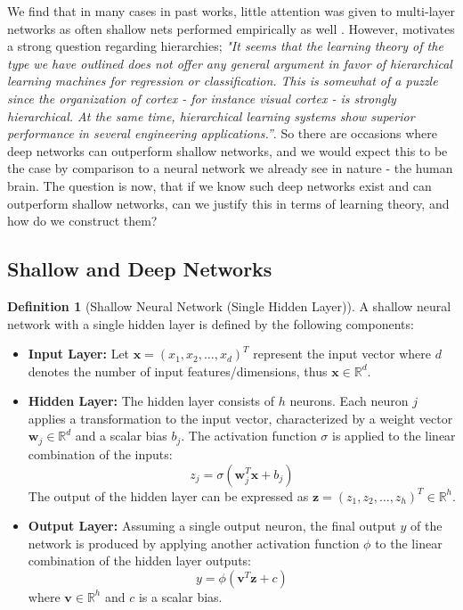 \documentclass[11pt,a4paper]{article}
\theoremstyle{plain}
\theoremstyle{definition}
\newtheorem{definition}[theorem]{Definition}
\theoremstyle{remark}
\begin{document}
\begin{itemize}
    We find that in many cases in past works, little attention was given to multi-layer networks as often shallow nets performed empirically as well \cite{what}. However, \cite{poggioHierarchy} motivates a strong question regarding hierarchies; \textit{"It seems that the learning theory of the type we have outlined does not offer any general argument in favor of hierarchical learning machines for regression or classification. This is somewhat of a puzzle since the organization of cortex - for instance visual cortex - is strongly hierarchical. At the same time, hierarchical learning systems show superior performance in several engineering applications.”}. So there are occasions where deep networks can outperform shallow networks, and we would expect this to be the case by comparison to a neural network we already see in nature - the human brain. The question is now, that if we know such deep networks exist and can outperform shallow networks, can we justify this in terms of learning theory, and how do we construct them?
\end{itemize}

\subsection{Shallow and Deep Networks}

\begin{definition}[Shallow Neural Network (Single Hidden Layer)]

A shallow neural network with a single hidden layer is defined by the following components:

\begin{itemize}
  \item \textbf{Input Layer:} Let \(\mathbf{x} = (x_1, x_2, \ldots, x_d)^T\) represent the input vector where \(d\) denotes the number of input features/dimensions, thus \(\mathbf{x} \in \mathbb{R}^d\).

  \item \textbf{Hidden Layer:} The hidden layer consists of \(h\) neurons. Each neuron \(j\) applies a transformation to the input vector, characterized by a weight vector \(\mathbf{w}_j \in \mathbb{R}^d\) and a scalar bias \(b_j\). The activation function \(\sigma\) is applied to the linear combination of the inputs:
    \[
    z_j = \sigma(\mathbf{w}_j^T \mathbf{x} + b_j)
    \]
    The output of the hidden layer can be expressed as \(\mathbf{z} = (z_1, z_2, \ldots, z_h)^T \in \mathbb{R}^h\).

  \item \textbf{Output Layer:} Assuming a single output neuron, the final output \(y\) of the network is produced by applying another activation function \(\phi\) to the linear combination of the hidden layer outputs:
    \[
    y = \phi(\mathbf{v}^T \mathbf{z} + c)
    \]
    where \(\mathbf{v} \in \mathbb{R}^h\) and \(c\) is a scalar bias.
\end{itemize}
\end{definition}
\end{document}
